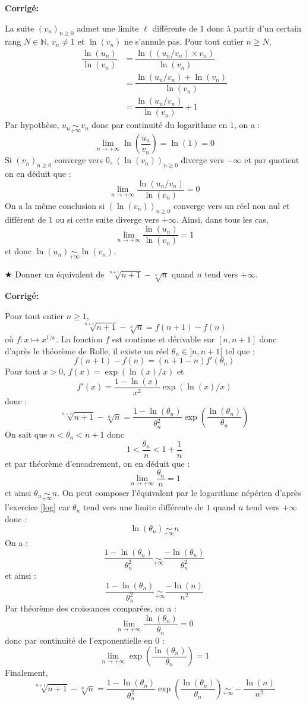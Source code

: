 \documentclass[a4paper,twoside,french,10pt]{VcCours}
\newcommand{\corr}{\textbf{Corrigé:}}
\begin{document}
\corr

La suite $(v_n)_{n \geq 0}$ admet une limite $\ell$ différente de $1$ donc à partir d'un certain rang $N \in \mathbb{N}$, $v_n \neq 1$ et $\ln(v_n)$ ne s'annule pas. Pour tout entier $n \geq N$,
\begin{align*}
 \dfrac{\ln(u_n)}{\ln(v_n)} & = \dfrac{\ln((u_n/v_n)\times v_n)}{\ln(v_n)} \\
 & = \dfrac{\ln(u_n/v_n) + \ln(v_n)}{\ln(v_n)} \\
 & = \dfrac{\ln(u_n/v_n)}{\ln(v_n)} + 1 
 \end{align*}
Par hypothèse, $u_n \underset{+ \infty}{\sim} v_n$ donc par continuité du logarithme en $1$, on a :
$$ \lim_{n \rightarrow + \infty} \ln \left( \dfrac{u_n}{v_n} \right) = \ln(1)=0$$
Si $(v_n)_{n \geq 0}$ converge vers $0$, $(\ln(v_n))_{n \geq 0}$ diverge vers $- \infty$ et par quotient on en déduit que :
$$ \lim_{n \rightarrow + \infty} \dfrac{\ln(u_n/v_n)}{\ln(v_n)} = 0$$
On a la même conclusion si $(\ln(v_n))_{n \geq 0}$ converge vers un réel non nul et différent de $1$ ou si cette suite diverge vers $+ \infty$. Ainsi, dans tous les cas, 
$$ \lim_{n \rightarrow + \infty}  \dfrac{\ln(u_n)}{\ln(v_n)} = 1$$
et donc $\ln(u_n) \underset{+ \infty}{\sim} \ln(v_n)$.

\medskip



\begin{Exercice}{$\bigstar$} Donner un équivalent de $\sqrt[n+1]{n+1} - \sqrt[n]{n}$ quand $n$ tend vers $+ \infty$.
\end{Exercice} 

\corr

Pour tout entier $n \geq 1$,
$$ \sqrt[n+1]{n+1} - \sqrt[n]{n} = f(n+1)-f(n)$$
où $f : x \mapsto x^{1/x}$. La fonction $f$ est continue et dérivable sur $[n,n+1]$ donc d'après le théorème de Rolle, il existe un réel $\theta_n \in ]n,n+1[$ tel que :
$$ f(n+1)-f(n) = (n+1-n) f'(\theta_n)$$
Pour tout $x>0$, $f(x)=\exp (\ln(x)/x)$ et 
$$ f'(x) = \dfrac{1-\ln(x)}{x^2} \exp(\ln(x)/x)$$
donc :
$$ \sqrt[n+1]{n+1} - \sqrt[n]{n} = \dfrac{1-\ln(\theta_n)}{\theta_n^2} \exp \left( \dfrac{\ln(\theta_n)}{\theta_n} \right)$$
On sait que $n< \theta_n < n+1$ donc 
$$ 1 < \dfrac{\theta_n}{n} < 1+ \dfrac{1}{n}$$
et par théorème d'encadrement, on en déduit que :
$$ \lim_{n \rightarrow + \infty} \dfrac{\theta_n}{n} = 1$$
et ainsi $\theta_n \underset{+ \infty}{\sim} n$. On peut composer l'équivalent par le logarithme népérien d'après l'exercice \ref{log} car $\theta_n$ tend vers une limite différente de $1$ quand $n$ tend vers $+ \infty$ donc :
$$ \ln(\theta_n) \underset{+ \infty}{\sim} n$$
On a :
$$ \dfrac{1-\ln(\theta_n)}{\theta_n^2} \underset{+ \infty}{\sim}  \dfrac{-\ln(\theta_n)}{\theta_n^2}$$
et ainsi :
$$  \dfrac{1-\ln(\theta_n)}{\theta_n^2} \underset{+ \infty}{\sim}  \dfrac{-\ln(n)}{n^2}$$
Par théorème des croissances comparées, on a :
$$ \lim_{n \rightarrow + \infty} \dfrac{\ln(\theta_n)}{\theta_n} = 0$$
donc par continuité de l'exponentielle en $0$ :
$$  \lim_{n \rightarrow + \infty} \exp \left( \dfrac{\ln(\theta_n)}{\theta_n} \right) =1$$
Finalement,
$$  \sqrt[n+1]{n+1} - \sqrt[n]{n} = \dfrac{1-\ln(\theta_n)}{\theta_n^2} \exp \left( \dfrac{\ln(\theta_n)}{\theta_n} \right) \underset{+ \infty}{\sim} - \dfrac{\ln(n)}{n^2}$$
\end{document}
